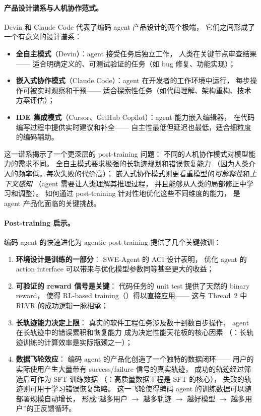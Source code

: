\paragraph{产品设计谱系与人机协作范式。}
Devin 和 Claude Code 代表了编码 agent 产品设计的两个极端，
它们之间形成了一个有意义的设计谱系：
\begin{itemize}[leftmargin=*]
  \item \textbf{全自主模式}（Devin）：agent 接受任务后独立工作，
    人类在关键节点审查结果——
    适合明确定义的、可测试验证的任务（如 bug 修复、功能实现）；
  \item \textbf{嵌入式协作模式}（Claude Code）：agent 在开发者的工作环境中运行，
    每步操作可被实时观察和干预——
    适合探索性任务（如代码理解、架构重构、技术方案评估）；
  \item \textbf{IDE 集成模式}（Cursor、GitHub Copilot）：agent 能力嵌入编辑器，
    在代码编写过程中提供实时建议和补全——
    自主性最低但延迟也最低，适合细粒度的编码辅助。
\end{itemize}
这一谱系揭示了一个更深层的 post-training 问题：
不同的人机协作模式对模型能力的需求不同。
全自主模式要求极强的长轨迹规划和错误恢复能力
（因为人类介入的频率低，每次失败的代价高）；
嵌入式协作模式则更看重模型的\emph{可解释性}和\emph{上下文感知}
（agent 需要让人类理解其推理过程，
并且能够从人类的局部修正中学习和调整）。
如何通过 post-training 针对性地优化这些不同维度的能力，
是 agent 产品化面临的关键挑战。

\paragraph{Post-training 启示。}
编码 agent 的快速进化为 agentic post-training 提供了几个关键教训：
\begin{enumerate}[leftmargin=*]
  \item \textbf{环境设计是训练的一部分}：
    SWE-Agent 的 ACI 设计表明，
    优化 agent 的 action interface 可以带来与优化模型参数同等甚至更大的收益；
  \item \textbf{可验证的 reward 信号是关键}：
    代码任务的 unit test 提供了天然的 binary reward，
    使得 RL-based training（）得以直接应用——
    这与 Thread~2 中 RLVR 的成功逻辑一脉相承；
  \item \textbf{长轨迹能力决定上限}：
    真实的软件工程任务涉及数十到数百步操作，
    agent 在长轨迹中的错误累积和恢复能力
    成为决定性能天花板的核心因素
    （：长轨迹训练的计算效率是实际瓶颈之一）；
  \item \textbf{数据飞轮效应}：
    编码 agent 的产品化创造了一个独特的数据闭环——
    用户的实际使用产生大量带有 success/failure 信号的真实轨迹，
    成功的轨迹经过筛选后可作为 SFT 训练数据
    （：高质量数据工程是 SFT 的核心），
    失败的轨迹则可用于学习错误恢复策略。
    这一飞轮使得编码 agent 的训练数据可以随部署规模自动增长，
    形成``越多用户 $\rightarrow$ 越多轨迹 $\rightarrow$ 越好模型 $\rightarrow$ 越多用户''的正反馈循环。
\end{enumerate}

